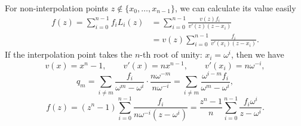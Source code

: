 For non-interpolation points $z \notin \{x_0, \ldots, x_{n-1}\}$, we can calculate its value {\Update easily}
\begin{align*}
    f(z) = \sum_{i=0}^{n-1}f_iL_i(z)
    &= \sum_{i=0}^{n-1}\frac{v(z)f_i}{v'(z)(z-x_i)} \\
    &= v(z) \sum_{i=0}^{n-1}\frac{f_i}{v'(x_i)(z-x_i)}.
\end{align*}
If the interpolation point takes the $n$-th root of unity: $x_i=\omega^i$, then we have
\[ v(x)=x^n-1, \qquad v'(x)=nx^{n-1}, \qquad v'(x_i)=n\omega^{-i}, \]
\[ q_m = \sum_{i \ne m} \frac{f_i}{\omega^m-\omega^i} \cdot \frac{n\omega^{-m}}{n\omega^{-i}}
= \sum_{i \ne m} \frac{\omega^{i-m} f_i}{\omega^m-\omega^i}, \]
\[ f(z) = (z^n-1) \sum_{i=0}^{n-1}\frac{f_i}{n\omega^{-i}(z-\omega^i)}
= \frac{z^n-1}{n}\sum_{i=0}^{n-1}\frac{f_i\omega^i}{z-\omega^i}. \]
